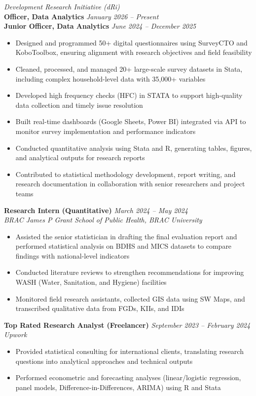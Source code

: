 \documentclass[11pt]{article}
\newcommand{\cvdate}[1]{\hfill{\small\itshape #1}}
\begin{document}
\textit{Development Research Initiative (dRi)}\\
\textbf{Officer, Data Analytics} \cvdate{January 2026 -- Present}\\
\textbf{Junior Officer, Data Analytics} \cvdate{June 2024 -- December 2025}
\begin{itemize}
  \item Designed and programmed 50+ digital questionnaires using SurveyCTO and KoboToolbox, ensuring alignment with research objectives and field feasibility
  \item Cleaned, processed, and managed 20+ large-scale survey datasets in Stata, including complex household-level data with 35,000+ variables
  \item Developed high frequency checks (HFC) in STATA to support high-quality data collection and timely issue resolution
  \item Built real-time dashboards (Google Sheets, Power BI) integrated via API to monitor survey implementation and performance indicators
  \item Conducted quantitative analysis using Stata and R, generating tables, figures, and analytical outputs for research reports
  \item Contributed to statistical methodology development, report writing, and research documentation in collaboration with senior researchers and project teams
\end{itemize}

\textbf{Research Intern (Quantitative)} \cvdate{March 2024 -- May 2024}\\
\textit{BRAC James P Grant School of Public Health, BRAC University}
\begin{itemize}
  \item Assisted the senior statistician in drafting the final evaluation report and performed statistical analysis on BDHS and MICS datasets to compare findings with national-level indicators
  \item Conducted literature reviews to strengthen recommendations for improving WASH (Water, Sanitation, and Hygiene) facilities
  \item Monitored field research assistants, collected GIS data using SW Maps, and transcribed qualitative data from FGDs, KIIs, and IDIs
\end{itemize}

\textbf{Top Rated Research Analyst (Freelancer)} \cvdate{September 2023 -- February 2024}\\
\textit{Upwork}
\begin{itemize}
  \item Provided statistical consulting for international clients, translating research questions into analytical approaches and technical outputs
  \item Performed econometric and forecasting analyses (linear/logistic regression, panel models, Difference-in-Differences, ARIMA) using R and Stata
\end{itemize}
\end{document}
